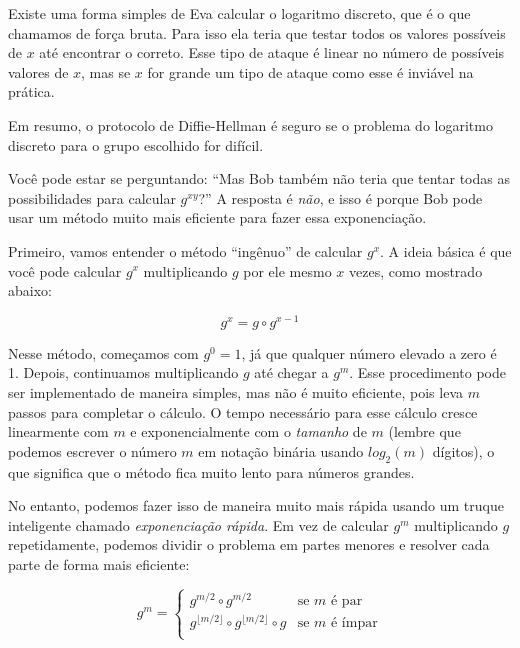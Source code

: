 Existe uma forma simples de Eva calcular o logaritmo discreto, que é o que chamamos de força bruta.
Para isso ela teria que testar todos os valores possíveis de $x$ até encontrar o correto. Esse tipo de ataque é linear no número de possíveis valores de $x$, mas se $x$ for grande um tipo de ataque como esse é inviável na prática.

Em resumo, o protocolo de Diffie-Hellman é seguro se o problema do logaritmo discreto para o grupo escolhido for difícil.


Você pode estar se perguntando:
``Mas Bob também não teria que tentar todas as possibilidades para calcular \( g^{xy} \)?''
A resposta é {\em não}, e isso é porque Bob pode usar um método muito mais eficiente para fazer essa exponenciação.

Primeiro, vamos entender o método ``ingênuo'' de calcular $g^x$.
A ideia básica é que você pode calcular $g^x$ multiplicando $g$ por ele mesmo $x$ vezes, como mostrado abaixo:

\begin{displaymath}
  g^x = g \circ g^{x-1}
\end{displaymath}

Nesse método, começamos com $g^0 = 1$, já que qualquer número elevado a zero é 1.
Depois, continuamos multiplicando $g$ até chegar a $g^m$.
Esse procedimento pode ser implementado de maneira simples, mas não é muito eficiente, pois leva $m$ passos para completar o cálculo.
O tempo necessário para esse cálculo cresce linearmente com $m$ e exponencialmente com o {\em tamanho} de $m$ (lembre que podemos escrever o número $m$ em notação binária usando $log_2(m)$ dígitos), o que significa que o método fica muito lento para números grandes.

No entanto, podemos fazer isso de maneira muito mais rápida usando um truque inteligente chamado \textit{exponenciação rápida}.
Em vez de calcular $g^m$ multiplicando $g$ repetidamente, podemos dividir o problema em partes menores e resolver cada parte de forma mais eficiente:

\begin{displaymath}
  g^m = \left\{
    \begin{array}{lcl}
      g^{m/2} \circ g^{m/2} & \text{se } m \text{ é par} \\
      g^{\lfloor m/2 \rfloor} \circ g^{\lfloor m/2 \rfloor} \circ g & \text{se } m \text{ é ímpar}\\
    \end{array}
  \right.
\end{displaymath}

